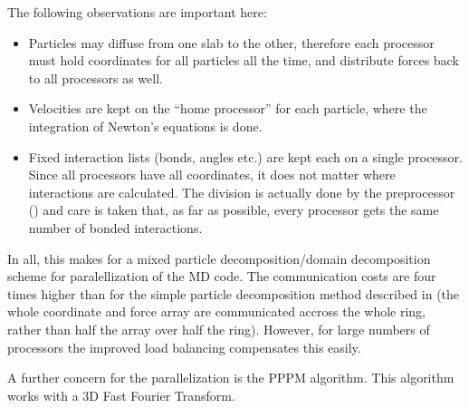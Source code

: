 The following observations are important here:
\begin{itemize}
\item	Particles may diffuse from one slab to the other, therefore each processor
	must hold coordinates for all particles all the time, and distribute forces
	back to all processors as well.
\item	Velocities are kept on the ``home processor'' for each particle,
	where the integration of Newton's equations is done.
\item	Fixed interaction lists (bonds, angles etc.) are kept each
	on a single processor.
	Since all processors have all coordinates, it does not matter where
	interactions are calculated.
	The division is actually done by the {\gromacs} preprocessor 
	() and care is taken that, as far as possible,
	every processor gets the same number of bonded interactions.
\end{itemize}

In all, this makes for a mixed particle decomposition/domain decomposition scheme
for paralellization of the MD code. The communication costs are four times higher
than for the simple particle decomposition method described in 
(the whole coordinate and force array are communicated accross the whole ring,
rather than half the array over half the ring).
However, for large numbers of processors the improved load balancing 
compensates this easily.

A further concern for the parallelization is the PPPM algorithm. This algorithm
works with a 3D Fast Fourier Transform.

